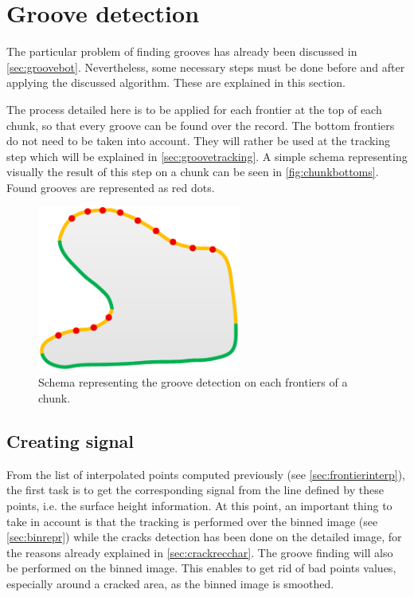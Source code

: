 \section{Groove detection}

The particular problem of finding grooves has already been discussed in \autoref{sec:groovebot}. Nevertheless, some necessary steps must be done before and after applying the discussed algorithm. These are explained in this section.

The process detailed here is to be applied for each frontier at the top of each chunk, so that every groove can be found over the record. The bottom frontiers do not need to be taken into account. They will rather be used at the tracking step which will be explained in \autoref{sec:groovetracking}. A simple schema representing visually the result of this step on a chunk can be seen in \autoref{fig:chunkbottoms}. Found grooves are represented as red dots.

\begin{figure}[!ht]
\centering
\includegraphics[width=0.6\textwidth]{images/chunk-bottoms}
\caption{Schema representing the groove detection on each frontiers of a chunk.}
\label{fig:chunkbottoms}
\end{figure}

\subsection{Creating signal}

From the list of interpolated points computed previously (see \autoref{sec:frontierinterp}), the first task is to get the corresponding signal from the line defined by these points, i.e. the surface height information. At this point, an important thing to take in account is that the tracking is performed over the binned image (see \autoref{sec:binrepr}) while the cracks detection has been done on the detailed image, for the reasons already explained in \autoref{sec:crackrecchar}. The groove finding will also be performed on the binned image. This enables to get rid of bad points values, especially around a cracked area, as the binned image is smoothed.

